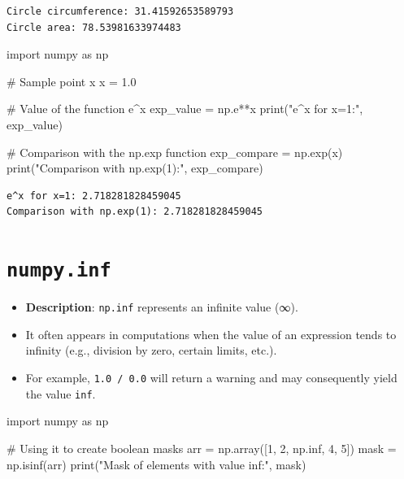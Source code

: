 \documentclass[
  english,
  letterpaper,
  DIV=11,
  numbers=noendperiod]{scrreprt}
\newenvironment{Shaded}{\begin{snugshade}}{\end{snugshade}}
\newcommand{\BuiltInTok}[1]{\textcolor[rgb]{0.00,0.23,0.31}{#1}}
\newcommand{\CommentTok}[1]{\textcolor[rgb]{0.37,0.37,0.37}{#1}}
\newcommand{\DecValTok}[1]{\textcolor[rgb]{0.68,0.00,0.00}{#1}}
\newcommand{\FloatTok}[1]{\textcolor[rgb]{0.68,0.00,0.00}{#1}}
\newcommand{\ImportTok}[1]{\textcolor[rgb]{0.00,0.46,0.62}{#1}}
\newcommand{\NormalTok}[1]{\textcolor[rgb]{0.00,0.23,0.31}{#1}}
\newcommand{\OperatorTok}[1]{\textcolor[rgb]{0.37,0.37,0.37}{#1}}
\newcommand{\StringTok}[1]{\textcolor[rgb]{0.13,0.47,0.30}{#1}}
\providecommand{\tightlist}{%
  \setlength{\itemsep}{0pt}\setlength{\parskip}{0pt}}
\begin{document}
\begin{verbatim}
Circle circumference: 31.41592653589793
Circle area: 78.53981633974483
\end{verbatim}

\begin{Shaded}
\begin{Highlighting}[]
\ImportTok{import}\NormalTok{ numpy }\ImportTok{as}\NormalTok{ np}

\CommentTok{\# Sample point x}
\NormalTok{x }\OperatorTok{=} \FloatTok{1.0}

\CommentTok{\# Value of the function e\^{}x}
\NormalTok{exp\_value }\OperatorTok{=}\NormalTok{ np.e}\OperatorTok{**}\NormalTok{x}
\BuiltInTok{print}\NormalTok{(}\StringTok{"e\^{}x for x=1:"}\NormalTok{, exp\_value)}

\CommentTok{\# Comparison with the np.exp function}
\NormalTok{exp\_compare }\OperatorTok{=}\NormalTok{ np.exp(x)}
\BuiltInTok{print}\NormalTok{(}\StringTok{"Comparison with np.exp(1):"}\NormalTok{, exp\_compare)}
\end{Highlighting}
\end{Shaded}

\begin{verbatim}
e^x for x=1: 2.718281828459045
Comparison with np.exp(1): 2.718281828459045
\end{verbatim}

\section{\texorpdfstring{\texttt{numpy.inf}}{numpy.inf}}\label{numpy.inf}

\begin{itemize}
\tightlist
\item
  \textbf{Description}: \texttt{np.inf} represents an infinite value
  (∞).\\
\item
  It often appears in computations when the value of an expression tends
  to infinity (e.g., division by zero, certain limits, etc.).\\
\item
  For example, \texttt{1.0\ /\ 0.0} will return a warning and may
  consequently yield the value \texttt{inf}.
\end{itemize}

\begin{Shaded}
\begin{Highlighting}[]
\ImportTok{import}\NormalTok{ numpy }\ImportTok{as}\NormalTok{ np}

\CommentTok{\# Using it to create boolean masks}
\NormalTok{arr }\OperatorTok{=}\NormalTok{ np.array([}\DecValTok{1}\NormalTok{, }\DecValTok{2}\NormalTok{, np.inf, }\DecValTok{4}\NormalTok{, }\DecValTok{5}\NormalTok{])}
\NormalTok{mask }\OperatorTok{=}\NormalTok{ np.isinf(arr)}
\BuiltInTok{print}\NormalTok{(}\StringTok{"Mask of elements with value inf:"}\NormalTok{, mask)}
\end{Highlighting}
\end{Shaded}
\end{document}
